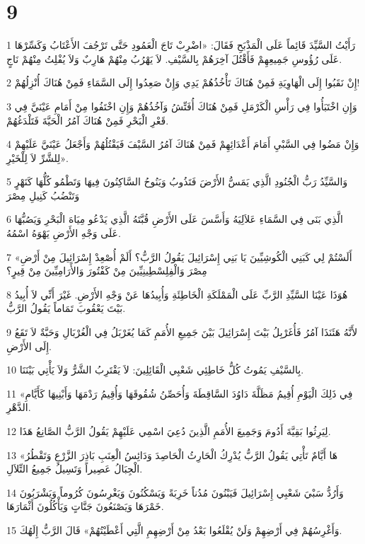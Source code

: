 \chapter{9}

\par 1 رَأَيْتُ السَّيِّدَ قَائِماً عَلَى الْمَذْبَحِ فَقَالَ: «اضْرِبْ تَاجَ الْعَمُودِ حَتَّى تَرْجُفَ الأَعْتَابُ وَكَسِّرْهَا عَلَى رُؤُوسِ جَمِيعِهِمْ فَأَقْتُلَ آخِرَهُمْ بِالسَّيْفِ. لاَ يَهْرُبُ مِنْهُمْ هَارِبٌ وَلاَ يُفْلِتُ مِنْهُمْ نَاجٍ.
\par 2 إِنْ نَقَبُوا إِلَى الْهَاوِيَةِ فَمِنْ هُنَاكَ تَأْخُذُهُمْ يَدِي وَإِنْ صَعِدُوا إِلَى السَّمَاءِ فَمِنْ هُنَاكَ أُنْزِلُهُمْ!
\par 3 وَإِنِ اخْتَبَأُوا فِي رَأْسِ الْكَرْمَلِ فَمِنْ هُنَاكَ أُفَتِّشُ وَآخُذُهُمْ وَإِنِ اخْتَفُوا مِنْ أَمَامِ عَيْنَيَّ فِي قَعْرِ الْبَحْرِ فَمِنْ هُنَاكَ آمُرُ الْحَيَّةَ فَتَلْدَغُهُمْ.
\par 4 وَإِنْ مَضُوا فِي السَّبْيِ أَمَامَ أَعْدَائِهِمْ فَمِنْ هُنَاكَ آمُرُ السَّيْفَ فَيَقْتُلُهُمْ وَأَجْعَلُ عَيْنَيَّ عَلَيْهِمْ لِلشَّرِّ لاَ لِلْخَيْرِ».
\par 5 وَالسَّيِّدُ رَبُّ الْجُنُودِ الَّذِي يَمَسُّ الأَرْضَ فَتَذُوبُ وَيَنُوحُ السَّاكِنُونَ فِيهَا وَتَطْمُو كُلُّهَا كَنَهْرٍ وَتَنْضُبُ كَنِيلِ مِصْرَ
\par 6 الَّذِي بَنَى فِي السَّمَاءِ عَلاَلِيَهُ وَأَسَّسَ عَلَى الأَرْضِ قُبَّتَهُ الَّذِي يَدْعُو مِيَاهَ الْبَحْرِ وَيَصُبُّهَا عَلَى وَجْهِ الأَرْضِ يَهْوَهُ اسْمُهُ.
\par 7 «أَلَسْتُمْ لِي كَبَنِي الْكُوشِيِّينَ يَا بَنِي إِسْرَائِيلَ يَقُولُ الرَّبُّ؟ أَلَمْ أُصْعِدْ إِسْرَائِيلَ مِنْ أَرْضِ مِصْرَ وَالْفِلِسْطِينِيِّينَ مِنْ كَفْتُورَ وَالأَرَامِيِّينَ مِنْ قِيرٍ؟
\par 8 هُوَذَا عَيْنَا السَّيِّدِ الرَّبِّ عَلَى الْمَمْلَكَةِ الْخَاطِئَةِ وَأُبِيدُهَا عَنْ وَجْهِ الأَرْضِ. غَيْرَ أَنِّي لاَ أُبِيدُ بَيْتَ يَعْقُوبَ تَمَاماً يَقُولُ الرَّبُّ.
\par 9 لأَنَّهُ هَئَنَذَا آمُرُ فَأُغَرْبِلُ بَيْتَ إِسْرَائِيلَ بَيْنَ جَمِيعِ الأُمَمِ كَمَا يُغَرْبَلُ فِي الْغُرْبَالِ وَحَبَّةٌ لاَ تَقَعُ إِلَى الأَرْضِ.
\par 10 بِالسَّيْفِ يَمُوتُ كُلُّ خَاطِئِي شَعْبِي الْقَائِلِينَ: لاَ يَقْتَرِبُ الشَّرُّ وَلاَ يَأْتِي بَيْنَنَا.
\par 11 «فِي ذَلِكَ الْيَوْمِ أُقِيمُ مَظَلَّةَ دَاوُدَ السَّاقِطَةَ وَأُحَصِّنُ شُقُوقَهَا وَأُقِيمُ رَدْمَهَا وَأَبْنِيهَا كَأَيَّامِ الدَّهْرِ.
\par 12 لِيَرِثُوا بَقِيَّةَ أَدُومَ وَجَمِيعَ الأُمَمِ الَّذِينَ دُعِيَ اسْمِي عَلَيْهِمْ يَقُولُ الرَّبُّ الصَّانِعُ هَذَا.
\par 13 «هَا أَيَّامٌ تَأْتِي يَقُولُ الرَّبُّ يُدْرِكُ الْحَارِثُ الْحَاصِدَ وَدَائِسُ الْعِنَبِ بَاذِرَ الزَّرْعِ وَتَقْطُرُ الْجِبَالُ عَصِيراً وَتَسِيلُ جَمِيعُ التِّلاَلِ.
\par 14 وَأَرُدُّ سَبْيَ شَعْبِي إِسْرَائِيلَ فَيَبْنُونَ مُدُناً خَرِبَةً وَيَسْكُنُونَ وَيَغْرِسُونَ كُرُوماً وَيَشْرَبُونَ خَمْرَهَا وَيَصْنَعُونَ جَنَّاتٍ وَيَأْكُلُونَ أَثْمَارَهَا.
\par 15 وَأَغْرِسُهُمْ فِي أَرْضِهِمْ وَلَنْ يُقْلَعُوا بَعْدُ مِنْ أَرْضِهِمِ الَّتِي أَعْطَيْتُهُمْ» قَالَ الرَّبُّ إِلَهُكَ.

